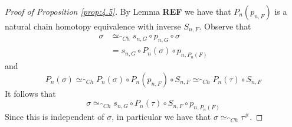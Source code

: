 \begin{proof}[Proof of Proposition \ref{prop:4.5}]
    By Lemma \textbf{REF} we have that $P_n(p_{n,F})$ is a natural chain homotopy equivalence with inverse $S_{n,F}$. Observe that
    \begin{align*}
        \sigma &\simeq_{\cat{Ch}} s_{n,G}\circ p_{n,G} \circ \sigma  \\
        &= s_{n,G}\circ P_n(\sigma)\circ p_{n,P_n(F)}
    \end{align*}
    and 
    \begin{equation*}
        P_n(\sigma) \simeq_{\cat{Ch}} P_n(\sigma)\circ P_n(p_{n,F})\circ S_{n,F} \simeq_{\cat{Ch}} P_n(\tau)\circ S_{n,F}
    \end{equation*}
    It follows that
    \begin{equation*}
        \sigma \simeq_{\cat{Ch}} s_{n,G}\circ P_n(\tau)\circ S_{n,F}\circ p_{n,P_n(F)}
    \end{equation*}
    Since this is independent of $\sigma$, in particular we have that $\sigma \simeq_{\cat{Ch}} \tau^\#$.
\end{proof}

